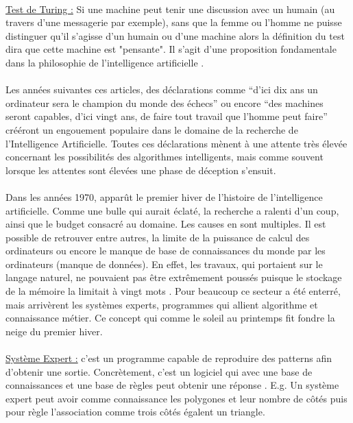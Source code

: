 \documentclass[10pt, french, a4paper]{report}
\begin{document}
\paragraph{}
\underline{Test de Turing :} Si une machine peut tenir une discussion avec un humain (au travers d’une messagerie par exemple), sans que la femme ou l’homme ne puisse distinguer qu’il s’agisse d’un humain ou d’une machine alors la définition du test dira que cette machine est "pensante". Il s’agit d’une proposition fondamentale dans la philosophie de l’intelligence artificielle \citep{pinar_saygin_turing_2000}. 

\paragraph{}
Les années suivantes ces articles, des déclarations comme ``d’ici dix ans un ordinateur sera le champion du monde des échecs'' \citep{simon_heuristic_1958} ou encore ``des machines seront capables, d’ici vingt ans, de faire tout travail que l’homme peut faire'' \citep{simon_shape_1965} crééront un engouement populaire dans le domaine de la recherche de l'Intelligence Artificielle. Toutes ces déclarations mènent à une attente très élevée concernant les possibilités des algorithmes intelligents, mais comme souvent lorsque les attentes sont élevées une phase de déception s’ensuit.

\paragraph{}
Dans les années 1970, apparût le premier hiver de l’histoire de l’intelligence artificielle. Comme une bulle qui aurait éclaté, la recherche a ralenti d’un coup, ainsi que le budget consacré au domaine. Les causes en sont multiples. Il est possible de retrouver entre autres, la limite de la puissance de calcul des ordinateurs ou encore le manque de base de connaissances du monde par les ordinateurs (manque de données). En effet, les travaux, qui portaient sur le langage naturel, ne pouvaient pas être extrêmement poussés puisque le stockage de la mémoire la limitait à vingt mots \citep{crevier_ai:_1992}. Pour beaucoup ce secteur a été enterré, mais arrivèrent les systèmes experts, programmes qui allient algorithme et connaissance métier. Ce concept qui comme le soleil au printemps fit fondre la neige du premier hiver.

\paragraph{}
\underline{Système Expert :} c'est un programme capable de reproduire des patterns afin d'obtenir une sortie. Concrètement, c'est un logiciel qui avec une base de connaissances et une base de règles peut obtenir une réponse \citep{jackson_introduction_1998}. E.g. Un système expert peut avoir comme connaissance les polygones et leur nombre de côtés puis pour règle l'association comme trois côtés égalent un triangle.
\end{document}
